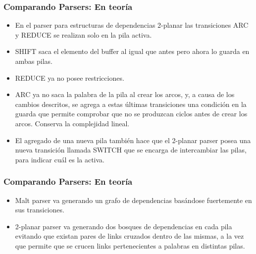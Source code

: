 \documentclass[spanish]{beamer}
\begin{document}
\begin{frame}
\frametitle{Comparando Parsers: En teoría}
\begin{itemize}[<+->]
\item En el parser para estructuras de dependencias 2-planar las 
transiciones ARC y REDUCE se realizan solo en la pila activa.
\item SHIFT saca el elemento del buffer al igual que antes pero ahora lo guarda en ambas pilas.
\item REDUCE ya no posee restricciones.
\item ARC ya no saca la palabra de la pila al crear los arcos, y, a causa de los cambios descritos, se agrega a estas últimas transiciones una condición en la guarda que permite comprobar que no se produzcan ciclos 
antes de crear los arcos. Conserva la complejidad lineal.
\item El agregado de una nueva pila también hace que el 2-planar parser posea una nueva transición llamada SWITCH que se encarga de intercambiar las pilas, para indicar cuál es la activa.
\end{itemize}
\end{frame}

\begin{frame}
\frametitle{Comparando Parsers: En teoría}
\begin{itemize}[<+->]
\item Malt parser va generando un grafo de dependencias basándose fuertemente 
en sus transiciones.
\item 2-planar parser va generando dos bosques de dependencias en cada pila evitando 
que existan pares de links cruzados dentro de las mismas, a la vez que permite que se crucen links pertenecientes a palabras en distintas pilas. 
\end{itemize}
\end{frame}
\end{document}
